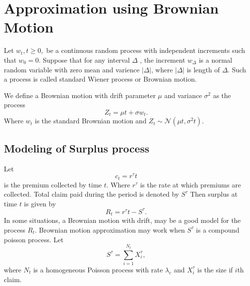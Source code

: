 \documentclass[a4paper,english,12pt]{article}
\begin{document}
\section{Approximation using Brownian Motion}
Let $w_t, t\geq0,$ be a continuous random process with independent increments such that $w_0=0$. Suppose that for any interval $\Delta$ , the increment $w_{\Delta}$ is a normal random variable with zero mean and varience $|\Delta|$, where $|\Delta|$ is length of $\Delta$. Such a process is called standard Wiener process or Brownian motion.

We define a Brownian motion with drift parameter $\mu$ and variance $\sigma^2$ as the process
\begin{equation}
Z_t=\mu t+\sigma w_t.
\end{equation}  
Where $w_t$ is the standard Brownian motion and $Z_t \sim \mathcal{N}(\mu t,\sigma^2t)$.
\subsection{Modeling of Surplus process}
Let
\begin{equation} 
c_t=r^\tau t
\end{equation}
is the premium collected by time $t$. Where $r^\tau$ is the rate at which premiums are collected. Total claim paid during the period is denoted by $S^\tau$ Then surplus at time $t$ is given by
\begin{equation}
R_t=r^\tau t-S^\tau.
\end{equation}
In some situations, a Brownian motion with drift, may be a good model for the process $R_t.$ Brownian motion approximation may work when $S^\tau$ is a compound poisson process. Let
\begin{equation}
S^\tau=\sum_{i=1}^{N_t}X_i^\tau,
\end{equation}
where $N_t$ is a homogeneous Poisson process with rate $\lambda_c$ and $X_i^\tau$ is the size if $i$th claim.
\end{document}
